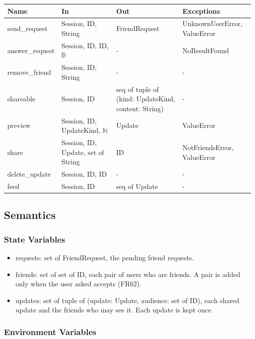 \documentclass[12pt, titlepage]{article}
\begin{document}
\begin{center}
\small
\setlength{\tabcolsep}{3pt}
\begin{tabular}{>{\raggedright\arraybackslash}p{3.9cm}
  >{\raggedright\arraybackslash}p{3.7cm}
  >{\raggedright\arraybackslash}p{3.4cm}
  >{\raggedright\arraybackslash}p{4.3cm}}
\toprule
\textbf{Name} & \textbf{In} & \textbf{Out} & \textbf{Exceptions} \\
\midrule
send\_request & Session, ID, String & FriendRequest & UnknownUserError,
ValueError \\
answer\_request & Session, ID, ID, $\mathbb{B}$ & - & NoResultFound \\
remove\_friend & Session, ID, String & - & - \\
shareable & Session, ID & seq of tuple of (kind: UpdateKind, content: String)
& - \\
preview & Session, ID, UpdateKind, $\mathbb{N}$ & Update & ValueError \\
share & Session, ID, Update, set of String & ID & NotFriendsError,
ValueError \\
delete\_update & Session, ID, ID & - & - \\
feed & Session, ID & seq of Update & - \\
\bottomrule
\end{tabular}
\end{center}

\subsection{Semantics}

\subsubsection{State Variables}

\begin{itemize}
\item requests: set of FriendRequest, the pending friend requests.
\item friends: set of set of ID, each pair of users who are friends. A pair
  is added only when the user asked accepts (FR62).
\item updates: set of tuple of (update: Update, audience: set of ID), each
  shared update and the friends who may see it. Each update is kept once.
\end{itemize}

\subsubsection{Environment Variables}
\end{document}
